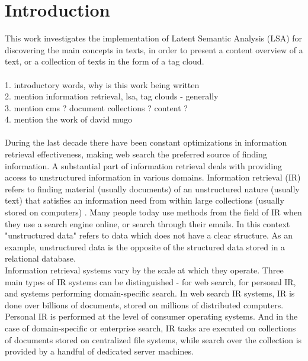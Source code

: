 \chapter{Introduction}
\label{sec:introduction}

This work investigates the implementation of Latent Semantic Analysis (LSA) for discovering the main concepts in texts, in order to present a content overview of a text, or a collection of texts in the form of a tag cloud.\\
\\
1. introductory words, why is this work being written \\
2. mention information retrieval, lsa, tag clouds - generally\\
3. mention cms ? document collections ? content ? \\
4. mention the work of david mugo \\
\\
During the last decade there have been constant optimizations in information retrieval effectiveness, making web search the preferred source of finding information. A substantial part of information retrieval deals with providing access to unstructured information in various domains. Information retrieval (IR) refers to finding material (usually documents) of an unstructured nature (usually text) that satisfies an information need from within large collections (usually stored on computers) \cite{Mann08}. Many people today use methods from the field of IR when they use a search engine online, or search through their emails. In this context "unstructured data" refers to data which does not have a clear structure. As an example, unstructured data is the opposite of the structured data stored in a relational database.    \\

Information retrieval systems vary by the scale at which they operate. Three main types of IR systems can be distinguished - for web search, for personal IR, and systems performing domain-specific search. In web search IR systems, IR is done over billions of documents, stored on millions of distributed computers. Personal IR is performed at the level of consumer operating systems. And in the case of domain-specific or enterprise search, IR tasks are executed on collections of documents stored on centralized file systems, while search over the collection is provided by a handful of dedicated server machines. \\

